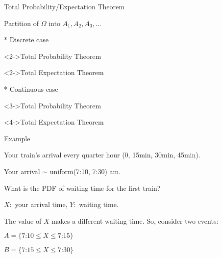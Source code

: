 \documentclass[fleqn,aspectratio=169]{beamer}
\begin{document}
\begin{frame}{Total Probability/Expectation Theorem}

Partition of $\Omega$ into $A_1,A_2,A_3, \ldots$

\medskip

{
\small
* Discrete case
\medskip

\begin{block}<2->{Total Probability Theorem}
 \end{block}

\begin{block}<2->{Total Expectation Theorem}
\end{block}
}
{
\small
* Continuous case
\medskip

\begin{block}<3->{Total Probability Theorem}
 \end{block}

\begin{block}<4->{Total Expectation Theorem}
\end{block}
}

\end{frame}

\begin{frame}{Example }

{

\bigskip


\plitemsep 0.1in
\bci 
\item<1-> Your train's arrival every quarter hour (0, 15min, 30min, 45min). 

\item<1-> Your arrival $\sim$ uniform(7:10, 7:30) am. 

\item<2-> What is the PDF of waiting time for the first train?

\item<3-> $X:$ your arrival time, $Y:$ waiting time.

\item<4-> The value of $X$ makes a different waiting time. So, consider two events:

\medskip
$A = \{\text{7:10} \leq X \leq \text{7:15} \}$

\medskip
$B = \{\text{7:15} \leq X \leq \text{7:30} \}$

\eci
}
{
\small
{}
}

\end{frame}
\end{document}

